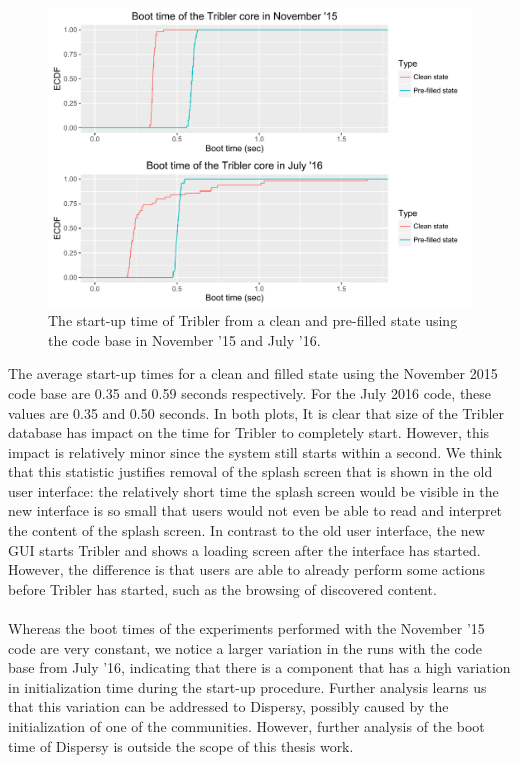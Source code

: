 \begin{figure}[!h]
	\centering
	\includegraphics[width=1.0\columnwidth]{images/experiments/startup}
	\caption{The start-up time of Tribler from a clean and pre-filled state using the code base in November '15 and July '16.}
	\label{fig:startup_experiment}
\end{figure}

The average start-up times for a clean and filled state using the November 2015 code base are 0.35 and 0.59 seconds respectively. For the July 2016 code, these values are 0.35 and 0.50 seconds. In both plots, It is clear that size of the Tribler database has impact on the time for Tribler to completely start. However, this impact is relatively minor since the system still starts within a second. We think that this statistic justifies removal of the splash screen that is shown in the old user interface: the relatively short time the splash screen would be visible in the new interface is so small that users would not even be able to read and interpret the content of the splash screen. In contrast to the old user interface, the new GUI starts Tribler and shows a loading screen after the interface has started. However, the difference is that users are able to already perform some actions before Tribler has started, such as the browsing of discovered content.\\\\
Whereas the boot times of the experiments performed with the November '15 code are very constant, we notice a larger variation in the runs with the code base from July '16, indicating that there is a component that has a high variation in initialization time during the start-up procedure. Further analysis learns us that this variation can be addressed to Dispersy, possibly caused by the initialization of one of the communities. However, further analysis of the boot time of Dispersy is outside the scope of this thesis work.

